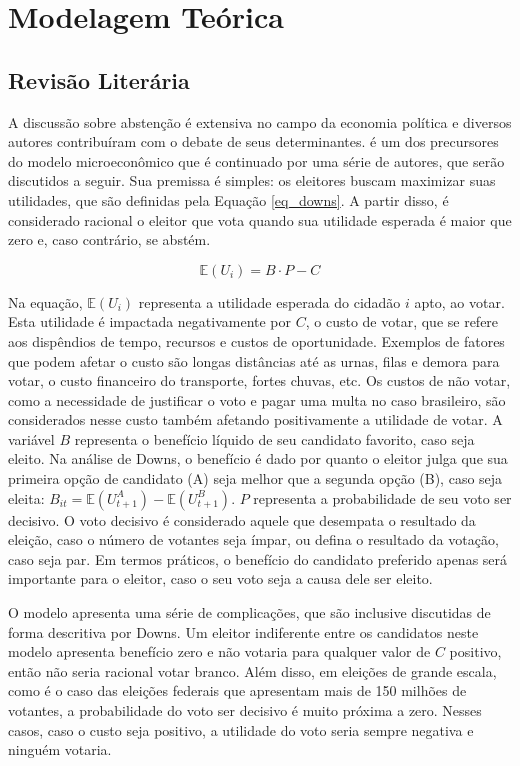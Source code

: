 \section{Modelagem Teórica}
\label{sec_teor}

\subsection{Revisão Literária}
\label{subsec_revisLit}

A discussão sobre abstenção é extensiva no campo da economia política e diversos autores contribuíram com o debate de seus determinantes. \textcite{downs1957economic} é um dos precursores do modelo microeconômico que é continuado por uma série de autores, que serão discutidos a seguir. Sua premissa é simples: os eleitores buscam maximizar suas utilidades, que são definidas pela Equação \ref{eq_downs}. A partir disso, é considerado racional o eleitor que vota quando sua utilidade esperada é maior que zero e, caso contrário, se abstém. 

\begin{equation}
\label{eq_downs}
    \mathbb{E}(U_i)=B\cdot P-C
\end{equation}

Na equação, $\mathbb{E}(U_i)$ representa a utilidade esperada do cidadão $i$ apto, ao votar. Esta utilidade é impactada negativamente por $C$, o custo de votar, que se refere aos dispêndios de tempo, recursos e custos de oportunidade. Exemplos de fatores que podem afetar o custo são longas distâncias até as urnas, filas e demora para votar, o custo financeiro do transporte, fortes chuvas, etc. Os custos de não votar, como a necessidade de justificar o voto e pagar uma multa no caso brasileiro, são considerados nesse custo também afetando positivamente a utilidade de votar. A variável $B$ representa o benefício líquido de seu candidato favorito, caso seja eleito. Na análise de Downs, o benefício é dado por quanto o eleitor julga que sua primeira opção de candidato (A) seja melhor que a segunda opção (B), caso seja eleita: $B_{it} = \mathbb{E}(U^A_{t+1})-\mathbb{E}(U^B_{t+1})$. $P$ representa a probabilidade de seu voto ser decisivo. O voto decisivo é considerado aquele que desempata o resultado da eleição, caso o número de votantes seja ímpar, ou defina o resultado da votação, caso seja par. Em termos práticos, o benefício do candidato preferido apenas será importante para o eleitor, caso o seu voto seja a causa dele ser eleito.

O modelo apresenta uma série de complicações, que são inclusive discutidas de forma descritiva por Downs. Um eleitor indiferente entre os candidatos neste modelo apresenta benefício zero e não votaria para qualquer valor de $C$ positivo, então não seria racional votar branco. Além disso, em eleições de grande escala, como é o caso das eleições federais que apresentam mais de 150 milhões de votantes, a probabilidade do voto ser decisivo é muito próxima a zero. Nesses casos, caso o custo seja positivo, a utilidade do voto seria sempre negativa e ninguém votaria.

